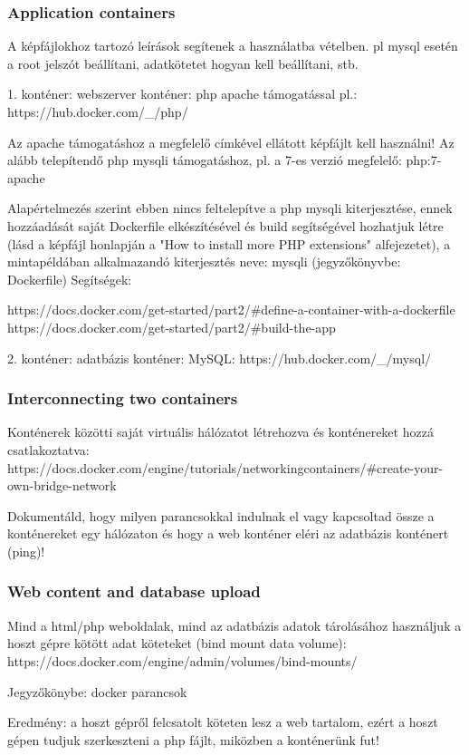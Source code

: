 \documentclass[a4paper]{article}
\begin{document}
\subsubsection{Application containers}
A képfájlokhoz tartozó leírások segítenek a használatba vételben. pl mysql esetén a root jelszót beállítani, adatkötetet hogyan kell beállítani, stb.

1. konténer: webszerver konténer: php apache támogatással pl.: https://hub.docker.com/_/php/

Az apache támogatáshoz a megfelelő címkével ellátott képfájlt kell használni! Az alább telepítendő php mysqli támogatáshoz, pl. a 7-es verzió megfelelő: php:7-apache

Alapértelmezés szerint ebben nincs feltelepítve a php mysqli kiterjesztése, ennek hozzáadását saját Dockerfile elkészítésével és build segítségével hozhatjuk létre (lásd a képfájl honlapján a "How to install more PHP extensions" alfejezetet), a mintapéldában alkalmazandó kiterjesztés neve: mysqli (jegyzőkönyvbe: Dockerfile)
Segítségek:

    https://docs.docker.com/get-started/part2/#define-a-container-with-a-dockerfile
    https://docs.docker.com/get-started/part2/#build-the-app 

2. konténer: adatbázis konténer: MySQL: https://hub.docker.com/_/mysql/

\subsubsection{Interconnecting two containers}
Konténerek közötti saját virtuális hálózatot létrehozva és konténereket hozzá csatlakoztatva: https://docs.docker.com/engine/tutorials/networkingcontainers/#create-your-own-bridge-network

Dokumentáld, hogy milyen parancsokkal indulnak el vagy kapcsoltad össze a konténereket egy hálózaton és hogy a web konténer eléri az adatbázis konténert (ping)!

\subsubsection{Web content and database upload}
Mind a html/php weboldalak, mind az adatbázis adatok tárolásához használjuk a hoszt gépre kötött adat köteteket (bind mount data volume): https://docs.docker.com/engine/admin/volumes/bind-mounts/

Jegyzőkönybe: docker parancsok

Eredmény: a hoszt gépről felcsatolt köteten lesz a web tartalom, ezért a hoszt gépen tudjuk szerkeszteni a php fájlt, miközben a konténerünk fut!
\end{document}

